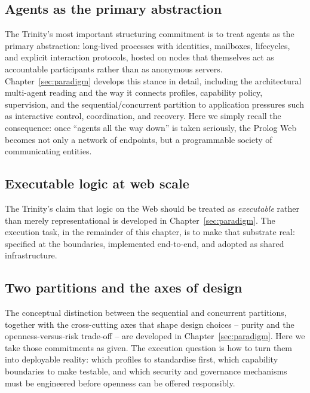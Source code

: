 \subsection{Agents as the primary abstraction}\label{sec:vision-agents}

The Trinity's most important structuring commitment is to treat agents as the primary abstraction: long-lived processes with identities, mailboxes, lifecycles, and explicit interaction protocols, hosted on nodes that themselves act as accountable participants rather than as anonymous servers. Chapter~\ref{sec:paradigm} develops this stance in detail, including the architectural multi-agent reading and the way it connects profiles, capability policy, supervision, and the sequential/concurrent partition to application pressures such as interactive control, coordination, and recovery. Here we simply recall the consequence: once ``agents all the way down'' is taken seriously, the Prolog Web becomes not only a network of endpoints, but a programmable society of communicating entities.

\subsection{Executable logic at web scale}\label{sec:vision-executable-logic}
The Trinity's claim that logic on the Web should be treated as
\emph{executable} rather than merely representational is developed in
Chapter~\ref{sec:paradigm}. The execution task, in the remainder of this
chapter, is to make that substrate real: specified at the boundaries,
implemented end-to-end, and adopted as shared infrastructure.

\subsection{Two partitions and the axes of design}\label{sec:vision-axes}

The conceptual distinction between the sequential and concurrent partitions,
together with the cross-cutting axes that shape design choices -- purity and the
openness-versus-risk trade-off -- are developed in Chapter~\ref{sec:paradigm}.
Here we take those commitments as given. The execution question is how to turn
them into deployable reality: which profiles to standardise first, which
capability boundaries to make testable, and which security and governance
mechanisms must be engineered before openness can be offered responsibly.


